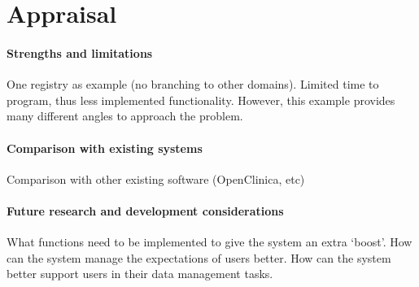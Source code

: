 \section{Appraisal}
\paragraph{Strengths and limitations}
One registry as example (no branching to other domains). 
Limited time to program, thus less implemented functionality.
However, this example provides many different angles to approach the problem.
\paragraph{Comparison with existing systems}
Comparison with other existing software (OpenClinica, etc)
\paragraph{Future research and development considerations}
What functions need to be implemented to give the system an extra `boost'.
How can the system manage the expectations of users better.
How can the system better support users in their data management tasks.
